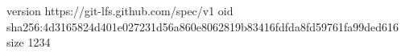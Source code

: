version https://git-lfs.github.com/spec/v1
oid sha256:4d3165824d401e027231d56a860e8062819b83416fdfda8fd59761fa99ded616
size 1234
